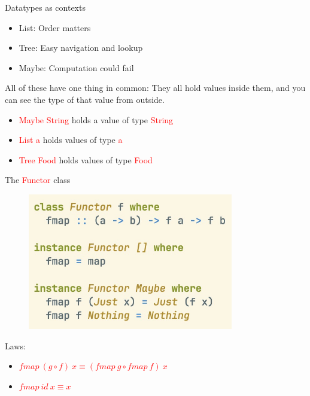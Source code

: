 \documentclass[pdf]{beamer}
\newcommand{\code}[1]{\textcolor{Red}{\textsf{#1}}}
\begin{document}
\begin{frame}{Datatypes as contexts}
  \begin{itemize}
  \item List: Order matters
  \item Tree: Easy navigation and lookup
  \item Maybe: Computation could fail
  \end{itemize}

  All of these have one thing in common: They all hold values inside them, and you can see the type of that value from outside.
  \begin{itemize}
  \item \code{Maybe String} holds a value of type \code{String}
  \item \code{List a} holds values of type \code{a}
  \item \code{Tree Food} holds values of type \code{Food}
  \end{itemize}

\end{frame}

\begin{frame}{The \code{Functor} class}
  \begin{figure}[H]
    \centering
    \includegraphics[width=0.80\textwidth]{functor-class}
  \end{figure}
  Laws:
  \begin{itemize}
  \item \code{$fmap \: (g \circ f) \: x \equiv (fmap \: g \circ fmap \: f) \: x$}
  \item \code{$fmap \: id \: x \equiv x$}
  \end{itemize}
\end{frame}
\end{document}
